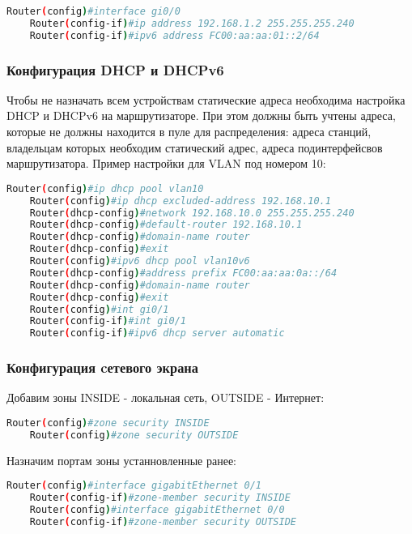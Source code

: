 \begin{lstlisting}[language=sh]
    Router(config)#interface gi0/0
    Router(config-if)#ip address 192.168.1.2 255.255.255.240
    Router(config-if)#ipv6 address FC00:aa:aa:01::2/64
\end{lstlisting}

\subsubsection{Конфигурация DHCP и DHCPv6}

Чтобы не назначать всем устройствам статические адреса необходима настройка DHCP и DHCPv6 на маршрутизаторе.
При этом должны быть учтены адреса, которые не должны находится в пуле для распределения: 
адреса станций, владельцам которых необходим статический адрес, 
адреса подинтерфейсвов маршрутизатора. Пример настройки для VLAN под номером 10: 

\begin{lstlisting}[language=sh]
    Router(config)#ip dhcp pool vlan10
    Router(config)#ip dhcp excluded-address 192.168.10.1
    Router(dhcp-config)#network 192.168.10.0 255.255.255.240
    Router(dhcp-config)#default-router 192.168.10.1
    Router(dhcp-config)#domain-name router
    Router(dhcp-config)#exit
    Router(config)#ipv6 dhcp pool vlan10v6
    Router(dhcp-config)#address prefix FC00:aa:aa:0a::/64
    Router(dhcp-config)#domain-name router
    Router(dhcp-config)#exit
    Router(config)#int gi0/1
    Router(config-if)#int gi0/1
    Router(config-if)#ipv6 dhcp server automatic
\end{lstlisting}

\subsubsection{Конфигурация cетевого экрана}
Добавим зоны INSIDE - локальная сеть, OUTSIDE - Интернет:
\begin{lstlisting}[language=sh]
    Router(config)#zone security INSIDE
    Router(config)#zone security OUTSIDE
\end{lstlisting}

Назначим портам зоны устанновленные ранее:
\begin{lstlisting}[language=sh]
    Router(config)#interface gigabitEthernet 0/1
    Router(config-if)#zone-member security INSIDE
    Router(config)#interface gigabitEthernet 0/0
    Router(config-if)#zone-member security OUTSIDE
\end{lstlisting}

